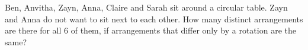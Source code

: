 Ben, Anvitha, Zayn, Anna, Claire and Sarah sit around a circular table. Zayn and Anna do not want to sit next to each other. How many distinct arrangements are there for all $6$ of them, if arrangements that differ only by a rotation are the same?
